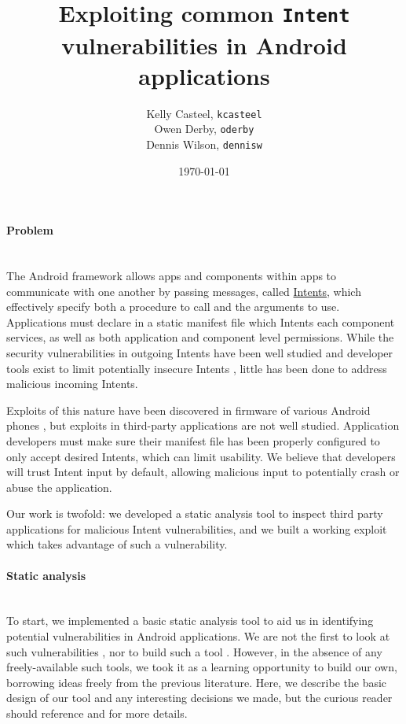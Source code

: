 \documentclass[12pt,a4paper]{article}
\title{Exploiting common \texttt{Intent} vulnerabilities in Android %
applications}
\date{\today}
\author{Kelly Casteel, \texttt{kcasteel}\\Owen Derby, \texttt{oderby}\\Dennis
Wilson, \texttt{dennisw}}
\begin{document}
 

\maketitle

\paragraph{Problem} ~\\
The Android framework allows apps and components within apps to communicate with
one another by passing messages, called
\href{https://developer.android.com/reference/android/content/Intent.html}{Intents},
which effectively specify both a procedure to call and the arguments to use.
Applications must declare in a static manifest file which Intents each component
services, as well as both application and component level permissions. While the
security vulnerabilities in outgoing Intents have been well studied
\cite{chin_analyzing_2011} and developer tools exist to limit potentially
insecure Intents \cite{lu_chex_2012}, little has been done to address malicious
incoming Intents. 

Exploits of this nature have been discovered in firmware of
various Android phones \cite{grace_systematic_2012}, but exploits in third-party
applications are not well studied. Application developers must make sure their
manifest file has been properly configured to only accept desired Intents, which
can limit usability. We believe that developers will trust Intent input by
default, allowing malicious input to potentially crash or abuse the application.

Our work is twofold: we developed a static analysis tool to inspect third party
applications for malicious Intent vulnerabilities, and we built a working
exploit which takes advantage of such a vulnerability.

\paragraph{Static analysis} ~\\
To start, we implemented a basic static analysis tool to aid us in identifying
potential vulnerabilities in Android applications. We are not the first to look
at such vulnerabilities \cite{chin_analyzing_2011}, nor to build such a tool
\cite{grace_systematic_2012}. However, in the absence of any freely-available
such tools, we took it as a learning opportunity to build our own, borrowing
ideas freely from the previous literature. Here, we describe the basic design
of our tool and any interesting decisions we made, but the curious reader should
reference \cite{chin_analyzing_2011} and \cite{grace_systematic_2012} for more
details.
\end{document}
